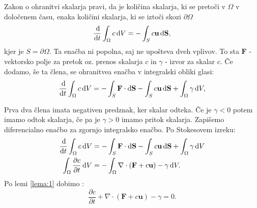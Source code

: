 \documentclass[mat2, tisk]{fmfdelo}
\newcommand{\bd}{\textbf}
\begin{document}
Zakon o ohranitvi skalarja pravi, da je količina skalarja, ki se pretoči v $\Omega$ v določenem času, 
enaka količini skalarja, ki se iztoči skozi $\partial\Omega$
\begin{equation}
\frac{\dif}{\dif t} \int_{\Omega} c \dif V =  - \int_S c \bd{u} \dif \bd{S},
\end{equation}
kjer je $S = \partial \Omega$. Ta enačba ni popolna, saj ne upošteva dveh vplivov.
To sta $\bd{F}$ - vektorsko polje za pretok oz. prenos skalarja $c$ in $\gamma$ - izvor za skalar $c$.
Če dodamo, še ta člena, se ohranitvea enačba v integralski obliki glasi:
\begin{equation}
  \frac{\dif}{\dif t} \int_{\Omega} c \dif V = - \int_S \bd{F} \cdot \dif \bd{S} - 
  \int_S c \bd{u}  \dif \bd{S} + \int_\Omega \gamma \dif V,
\end{equation}    

Prva dva člena imata negativen predznak, ker skalar odteka. Če je $\gamma < 0$ potem imamo odtok skalarja, če pa je $\gamma > 0$ imamo pritok skalarja. 
Zapišemo diferencialno enačbo za zgornjo integralsko enačbo. Po Stokesovem izreku:
\begin{align*}
\frac{\dif}{\dif t} \int_{\Omega} c \dif V &= - \int_S \bd{F} \cdot \dif \bd{S} - 
\int_S c \bd{u}  \dif \bd{S} + \int_\Omega \gamma \dif V \\
\int_{\Omega} \frac{\partial c}{\partial t} \dif V &= - \int_\Omega \nabla\cdot(\bd{F} + c \bd{u}) - \gamma \dif V .
\end{align*}
Po lemi \ref{lema:1} dobimo :
\begin{equation}
\frac{\partial c}{\partial t} + \nabla \cdot (\bd{F} + c\bd{u}) - \gamma = 0.
\end{equation}
\end{document}
